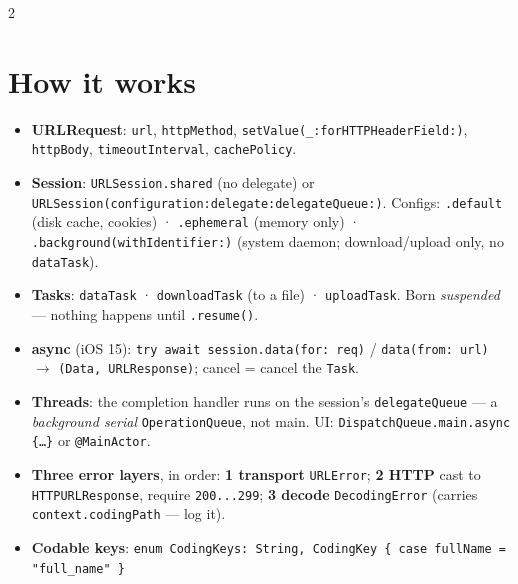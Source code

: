 \documentclass[8pt]{extarticle}
\begin{document}



\begin{multicols}{2}
\raggedright

\section{How it works}
\begin{itemize}
  \item \textbf{URLRequest}: \texttt{url}, \texttt{httpMethod}, \texttt{setValue(\_:forHTTPHeaderField:)},
        \texttt{httpBody}, \texttt{timeoutInterval}, \texttt{cachePolicy}.
  \item \textbf{Session}: \texttt{URLSession.shared} (no delegate) or
        \texttt{URLSession(configuration:\allowbreak delegate:\allowbreak delegateQueue:)}. Configs:
        \texttt{.default} (disk cache, cookies) · \texttt{.ephemeral} (memory only) ·
        \texttt{.background(withIdentifier:)} (system daemon; download/upload only, no \texttt{dataTask}).
  \item \textbf{Tasks}: \texttt{dataTask} · \texttt{downloadTask} (to a file) · \texttt{uploadTask}.
        Born \emph{suspended} — nothing happens until \texttt{.resume()}.
  \item \textbf{async} (iOS 15): \texttt{try await session.data(for: req)} /
        \texttt{data(from: url)} $\to$ \texttt{(Data, URLResponse)}; cancel = cancel the \texttt{Task}.
  \item \textbf{Threads}: the completion handler runs on the session's \texttt{delegateQueue}
        — a \emph{background serial} \texttt{OperationQueue}, not main. UI:
        \texttt{DispatchQueue.main.async \{…\}} or \texttt{@MainActor}.
  \item \textbf{Three error layers}, in order:
        \textbf{1 transport} \texttt{URLError};
        \textbf{2 HTTP} cast to \texttt{HTTPURLResponse}, require \texttt{200...299};
        \textbf{3 decode} \texttt{DecodingError} (carries \texttt{context.codingPath} — log it).
  \item \textbf{Codable keys}: \texttt{enum CodingKeys: String, CodingKey \{ case fullName = "full\_name" \}}

\end{itemize}
\end{multicols}
\end{document}
